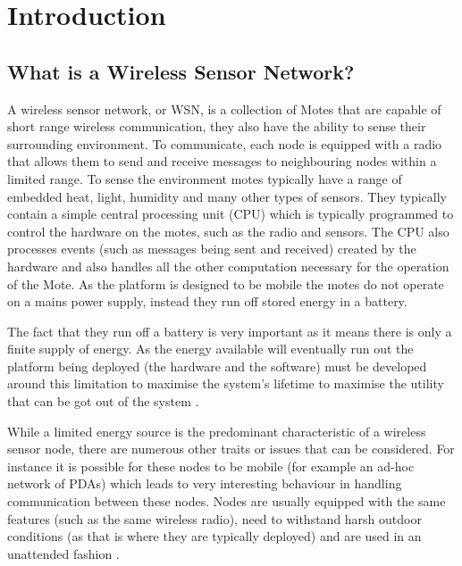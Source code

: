\section{Introduction}

\subsection{What is a Wireless Sensor Network?}

A wireless sensor network, or WSN, is a collection of Motes that are capable of short range wireless communication, they also have the ability to sense their surrounding environment\cite{Mica2002,TankBible}. To communicate, each node is equipped with a radio that allows them to send and receive messages to neighbouring nodes within a limited range. To sense the environment motes typically have a range of embedded heat, light, humidity and many other types of sensors. They typically contain a simple central processing unit (CPU) which is typically programmed to control the hardware on the motes, such as the radio and sensors. The CPU also processes events (such as messages being sent and received) created by the hardware and also handles all the other computation necessary for the operation of the Mote. As the platform is designed to be mobile the motes do not operate on a mains power supply, instead they run off stored energy in a battery. 


The fact that they run off a battery is very important as it means there is only a finite supply of energy. As the energy available will eventually run out the platform being deployed (the hardware and the software) must be developed around this limitation to maximise the system's lifetime to maximise the utility that can be got out of the system \cite{1331424}.

While a limited energy source is the predominant characteristic of a wireless sensor node, there are numerous other traits or issues that can be considered. For instance it is possible for these nodes to be mobile (for example an ad-hoc network of PDAs) \cite{4224091} which leads to very interesting behaviour in handling communication between these nodes. Nodes are usually equipped with the same features (such as the same wireless radio), need to withstand harsh outdoor conditions (as that is where they are typically deployed) \cite{SzewczykPMC04, Werner-Allen:2006:FYV:1298455.1298491} and are used in an unattended fashion \cite{1437066}.

